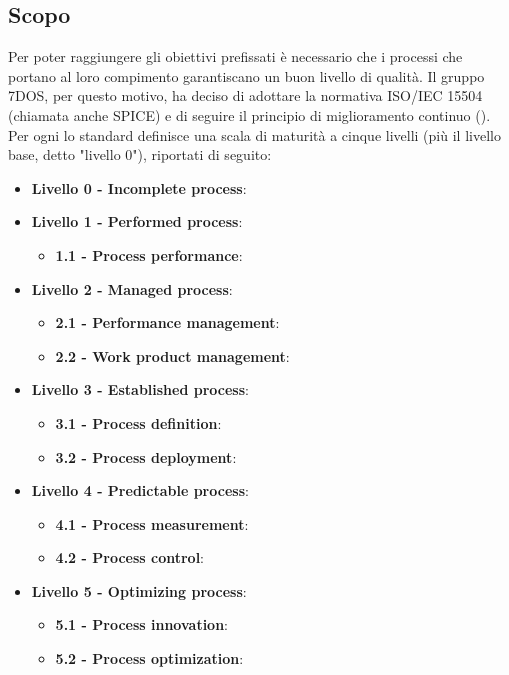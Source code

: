 
\subsection{Scopo}
	Per poter raggiungere gli obiettivi prefissati è necessario che i processi che portano al loro compimento garantiscano un buon livello  	di qualità. Il gruppo 7DOS, per questo motivo, ha deciso di adottare la normativa ISO/IEC 15504 (chiamata anche SPICE) e di 	seguire il principio di miglioramento continuo (). \\ Per ogni  lo standard definisce una scala di maturità a cinque livelli (più il livello base, detto "livello 0"), riportati di seguito:
	
	\begin{itemize}
	\item \textbf {Livello 0 - Incomplete process}:
	\item \textbf {Livello 1 - Performed process}:
		\begin{itemize}
		\item \textbf{1.1 - Process performance}:
		\end{itemize}
	\item \textbf {Livello 2 - Managed process}:
		\begin{itemize}
		\item \textbf{2.1 - Performance management}:
		\item \textbf{2.2 - Work product management}:
		\end{itemize}
	\item \textbf {Livello 3 - Established process}:
		\begin{itemize}
		\item \textbf{3.1 - Process definition}:
		\item \textbf{3.2 - Process deployment}:
		\end{itemize}
	\item \textbf {Livello 4 - Predictable process}:
		\begin{itemize}
		\item \textbf{4.1 - Process measurement}:
		\item \textbf{4.2 - Process control}:
		\end{itemize}
	\item \textbf {Livello 5 - Optimizing process}:
		\begin{itemize}
		\item \textbf{5.1 - Process innovation}:
		\item \textbf{5.2 - Process optimization}:
		\end{itemize}
	\end{itemize}
	
